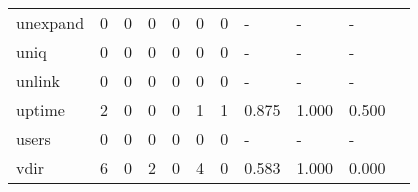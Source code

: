\begin{longtable}{lp{1.2cm}p{1.2cm}p{1.2cm}p{1.2cm}p{1.2cm}p{1.2cm}p{1.2cm}p{1.2cm}p{1.2cm}p{1.2cm}}
unexpand  &                                     0 &                                                  0 &                                                  0 &                                                  0 &                                                  0 &                                                  0 &                                                  - &                                                  - &                                                  - \\
uniq      &                                     0 &                                                  0 &                                                  0 &                                                  0 &                                                  0 &                                                  0 &                                                  - &                                                  - &                                                  - \\
unlink    &                                     0 &                                                  0 &                                                  0 &                                                  0 &                                                  0 &                                                  0 &                                                  - &                                                  - &                                                  - \\
uptime    &                                     2 &                                                  0 &                                                  0 &                                                  0 &                                                  1 &                                                  1 &                                              0.875 &                                              1.000 &                                              0.500 \\
users     &                                     0 &                                                  0 &                                                  0 &                                                  0 &                                                  0 &                                                  0 &                                                  - &                                                  - &                                                  - \\
vdir      &                                     6 &                                                  0 &                                                  2 &                                                  0 &                                                  4 &                                                  0 &                                              0.583 &                                              1.000 &                                              0.000 \\

\end{longtable}
